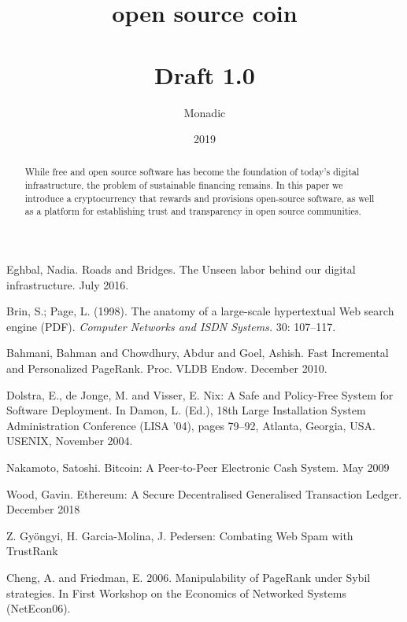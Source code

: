 \documentclass[a4paper, oneside, 10pt, draft]{amsart}
\begin{document}
\title[open source coin]{open source coin \\ \vspace{0.5em} \\ {\tiny Draft 1.0}}
\author{Monadic}
\date{2019}

\begin{abstract}
\small While free and open source software has become the foundation of today's
digital infrastructure, the problem of sustainable financing remains.  In this
paper we introduce a cryptocurrency that rewards and provisions open-source
software, as well as a platform for establishing trust and transparency in open
source communities.
\end{abstract}

\maketitle

\setlength{\columnsep}{1cm}
\begin{multicols}{2}

\medskip








\begin{thebibliography}{9}

 Eghbal, Nadia. Roads and Bridges. The Unseen labor
  behind our digital infrastructure. July 2016.

 Brin, S.; Page, L. (1998). The anatomy of a
  large-scale hypertextual Web search engine (PDF). \emph{Computer Networks
  and ISDN Systems.} 30: 107–117.

 Bahmani, Bahman and Chowdhury, Abdur and Goel,
  Ashish. Fast Incremental and Personalized PageRank. Proc. VLDB
  Endow. December 2010.

 Dolstra, E., de Jonge, M. and Visser, E. Nix: A Safe and
  Policy-Free System for Software Deployment. In Damon, L. (Ed.), 18th Large
  Installation System Administration Conference (LISA '04), pages 79–92, Atlanta,
  Georgia, USA. USENIX, November 2004.

 Nakamoto, Satoshi. Bitcoin: A Peer-to-Peer Electronic Cash
  System. May 2009

 Wood, Gavin. Ethereum: A Secure Decentralised Generalised
  Transaction Ledger. December 2018

 Z. Gyöngyi, H. Garcia-Molina, J. Pedersen: Combating Web
  Spam with TrustRank

 Cheng, A. and Friedman, E. 2006. Manipulability of
  PageRank under Sybil strategies. In First Workshop on the Economics of
  Networked Systems (NetEcon06).

\end{thebibliography}

\end{multicols}
\end{document}

